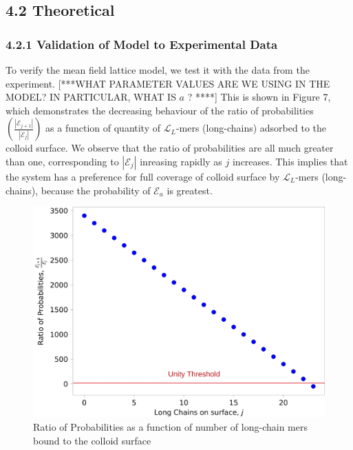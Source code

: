\documentclass[journal=mamobx,manuscript=article]{achemso}
\newcommand{\leng}{\mathcal{L}}
\begin{document}
\subsection{4.2 Theoretical}

\subsubsection{4.2.1 Validation of Model to Experimental Data}

To verify the mean field lattice model, we test it with the data from the experiment. [***WHAT PARAMETER VALUES ARE WE USING
IN THE MODEL?  IN PARTICULAR, WHAT IS $a$ ? ****]
This is shown in Figure 7, which demonstrates the decreasing behaviour of the ratio of probabilities 
$\left(\frac{|\mathcal{E}_{j+1}|}{|\mathcal{E}_j|}\right)$ as a function of quantity of $\leng_L$-mers (long-chains) adsorbed to the colloid surface. We observe that the ratio of probabilities %
are all much
greater than one, corresponding to $|\mathcal{E}_j|$ 
inreasing rapidly as $j$ increases.
This implies that the system has a preference for full coverage of colloid surface by $\leng_L$-mers (long-chains), because the probability of $\mathcal{E}_a$ is greatest.


\begin{figure}[H]
\includegraphics[scale=0.10]{Figure_1.jpg}
\caption{Ratio of Probabilities as a function of number of long-chain mers bound to the colloid surface}
\label{figure 11}
\end{figure}
\end{document}
